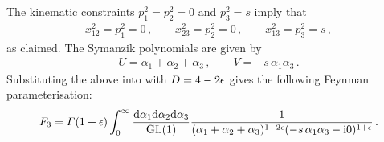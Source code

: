 The kinematic constraints $p_1^2 = p_2^2 = 0$ and $p_3^2 = s$ imply that
\begin{align}
x^2_{12} = p_1^2 = 0 \,, \qquad x^2_{23} = p_2^2 = 0 \,, \qquad x^2_{13} = p_3^2 = s \,,
\end{align}
as claimed. 
%
The Symanzik polynomials are given by
\begin{align}
U = \alpha_1 + \alpha_2 + \alpha_3 \,, \qquad V = - s \, \alpha_1 \alpha_3 \,.
\end{align}
Substituting the above into  with $D=4-2 \epsilon$ 
gives the following Feynman parameterisation:
\begin{align}
F_3 = \Gamma(1+\eps) \int_0^{\infty} \frac{\d \alpha_1 \d \alpha_2 \d \alpha_3}{\text{GL}(1)} 
  \frac{1}{(\alpha_1+\alpha_2+\alpha_3)^{1-2\eps} (- s \, \alpha_1 \alpha_3 - \i 0)^{1+\eps} } \,.
\end{align}



